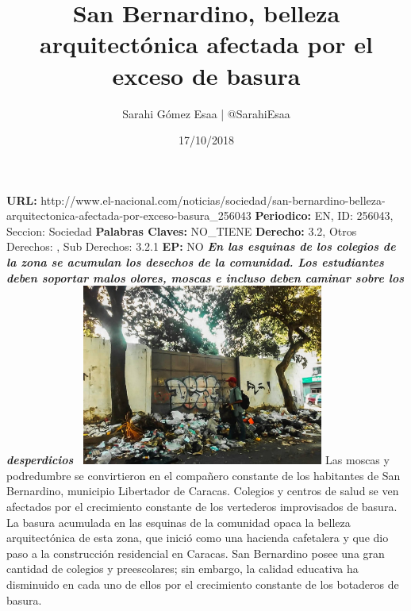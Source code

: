 \documentclass{article}%
\title{\textbf{San Bernardino, belleza arquitectónica afectada por el exceso de basura}}%
\author{Sarahi Gómez Esaa | @SarahiEsaa}%
\date{17/10/2018}%
\begin{document}
%
\normalsize%
\maketitle%
\textbf{URL: }%
http://www.el{-}nacional.com/noticias/sociedad/san{-}bernardino{-}belleza{-}arquitectonica{-}afectada{-}por{-}exceso{-}basura\_256043\newline%
%
\textbf{Periodico: }%
EN, %
ID: %
256043, %
Seccion: %
Sociedad\newline%
%
\textbf{Palabras Claves: }%
NO\_TIENE\newline%
%
\textbf{Derecho: }%
3.2, %
Otros Derechos: %
, %
Sub Derechos: %
3.2.1\newline%
%
\textbf{EP: }%
NO\newline%
\newline%
%
\textbf{\textit{En las esquinas de los colegios de la zona se acumulan los desechos de la comunidad. Los estudiantes deben soportar malos olores, moscas e incluso deben caminar sobre los desperdicios~}}%
\newline%
\newline%
%
\includegraphics[width=300px]{186.jpg}%
\newline%
%
Las moscas y podredumbre se convirtieron en el compañero constante de los habitantes de San Bernardino, municipio Libertador de Caracas. Colegios y centros de salud se ven afectados por el crecimiento constante de los vertederos improvisados de basura.%
\newline%
%
La basura acumulada en las esquinas de la comunidad opaca la belleza arquitectónica de esta zona, que inició como una hacienda cafetalera y que dio paso a la construcción residencial en Caracas.%
\newline%
%
San Bernardino posee una gran cantidad de colegios y preescolares; sin embargo, la calidad educativa ha disminuido en cada uno de ellos por el crecimiento constante de los botaderos de basura.%
\newline%
\end{document}
